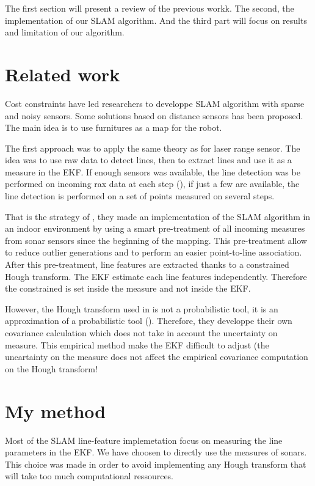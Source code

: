 \documentclass[a4paper,12pt]{article}
\begin{document}
The first section will present a review of the previous workk. The second, the implementation of our SLAM algorithm. And the third part will focus on results and limitation of our algorithm.

\section{Related work}
\label{sec:relwork}

Cost constraints have led researchers to developpe SLAM algorithm with sparse and noisy sensors.
Some solutions based on distance sensors has been proposed.
The main idea is to use furnitures as a map for the robot.

The first approach was to apply the same theory as for laser range sensor.
The idea was to use raw data to detect lines, then to extract lines and use it as a measure in the EKF.
If enough sensors was available, the line detection was be performed on incoming rax data at each step (\cite{grossmann2001robust}), if just a few are available, the line detection is performed on a set of points measured on several steps.

That is the strategy of \cite{choi2008line}, they made an implementation of the SLAM algorithm in an indoor environment by using a smart pre-treatment of all incoming measures from sonar sensors since the beginning of the mapping. This pre-treatment allow to reduce outlier generations and to perform an easier point-to-line association.
After this pre-treatment, line features are extracted thanks to a constrained Hough transform. The EKF estimate each line features independently.
Therefore the constrained is set inside the measure and not inside the EKF.

However, the Hough transform used in \cite{choi2008line} is not a probabilistic tool, it is an approximation of a probabilistic tool (\cite{stephens1991probabilistic}).
Therefore, they developpe their own covariance calculation which does not take in account the uncertainty on measure.
This empirical method make the EKF difficult to adjust (the uncartainty on the measure does not affect the empirical covariance computation on the Hough transform!

\section{My method}
\label{sec:method}

Most of the SLAM line-feature implemetation focus on measuring the line parameters in the EKF. We have choosen to directly use the measures of sonars.
This choice was made in order to avoid implementing any Hough transform that will take too much computational ressources.
\end{document}
